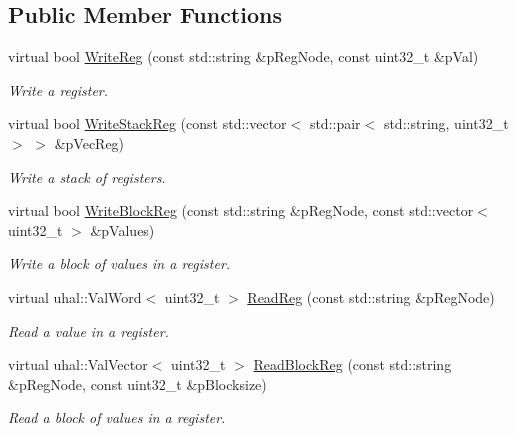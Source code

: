 \subsection*{Public Member Functions}
\begin{CompactItemize}
\item 
virtual bool \hyperlink{class_ph2___hw_interface_1_1_reg_manager_31174516fef6706c88c3f59dd93e4fdf}{Write\-Reg} (const std::string \&p\-Reg\-Node, const uint32\_\-t \&p\-Val)
\begin{CompactList}\small\item\em Write a register. \item\end{CompactList}\item 
virtual bool \hyperlink{class_ph2___hw_interface_1_1_reg_manager_be0d1107ea6f4804b2ddc92509f181d6}{Write\-Stack\-Reg} (const std::vector$<$ std::pair$<$ std::string, uint32\_\-t $>$ $>$ \&p\-Vec\-Reg)
\begin{CompactList}\small\item\em Write a stack of registers. \item\end{CompactList}\item 
virtual bool \hyperlink{class_ph2___hw_interface_1_1_reg_manager_888f5cccb05daa28896cf622abfdcbd6}{Write\-Block\-Reg} (const std::string \&p\-Reg\-Node, const std::vector$<$ uint32\_\-t $>$ \&p\-Values)
\begin{CompactList}\small\item\em Write a block of values in a register. \item\end{CompactList}\item 
virtual uhal::Val\-Word$<$ uint32\_\-t $>$ \hyperlink{class_ph2___hw_interface_1_1_reg_manager_077e0a18592206365150680213345112}{Read\-Reg} (const std::string \&p\-Reg\-Node)
\begin{CompactList}\small\item\em Read a value in a register. \item\end{CompactList}\item 
virtual uhal::Val\-Vector$<$ uint32\_\-t $>$ \hyperlink{class_ph2___hw_interface_1_1_reg_manager_6481c211d27badc409ff0e7af20575e4}{Read\-Block\-Reg} (const std::string \&p\-Reg\-Node, const uint32\_\-t \&p\-Blocksize)
\begin{CompactList}\small\item\em Read a block of values in a register. \item\end{CompactList}\item 

\end{CompactItemize}

